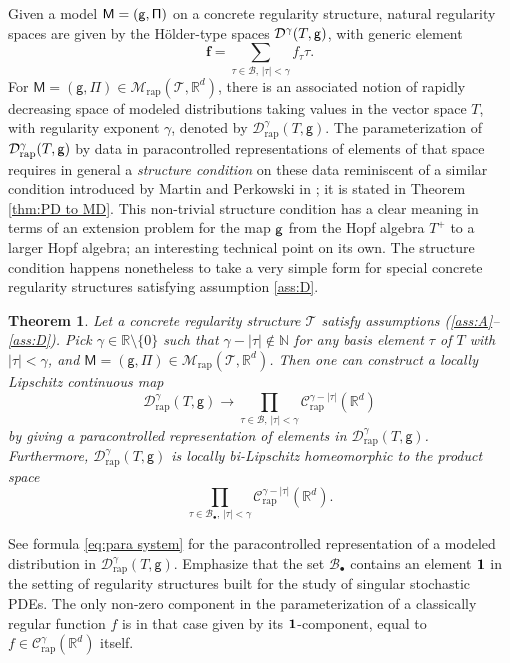 \documentclass[11pt]{article}
\numberwithin{equation}{section}
\newcommand{\sbullet}{{\scriptscriptstyle\bullet}}
\theoremstyle{plain}
\newtheorem{thm}{Theorem}
\theoremstyle{definition}
\newcommand{\bsf}{\boldsymbol{f}}
\newcommand{\rap}{\mathrm{rap}}
\newcommand{\sfM}{\mathsf{M}}
\newcommand{\sfg}{\mathsf{g}}
\newcommand{\sfPi}{\mathsf{\Pi}}
\newcommand{\scrM}{\mathscr{M}}
\newcommand{\scrT}{\mathscr{T}}
\newcommand{\bbN}{\mathbb{N}}
\newcommand{\bbR}{\mathbb{R}}
\newcommand{\mcB}{\mathcal{B}}
\newcommand{\mcC}{\mathcal{C}}
\newcommand{\mcD}{\mathcal{D}}
\begin{document}
Given a model $\sf M=(g,\Pi)$ on a concrete regularity structure, natural regularity spaces are given by the Hölder-type spaces $\mcD^\gamma(T,\sf g)$, with generic element
\[
\bsf = \sum_{\tau\in\mcB,\, \vert\tau\vert < \gamma} f_\tau \tau.
\]
For $\sfM=(\sfg,\sfPi)\in\scrM_\rap(\scrT, \bbR^d)$, there is an associated notion of rapidly decreasing space of modeled distributions taking values in the vector space $T$, with regularity exponent $\gamma$, denoted by $\mcD_\rap^\gamma(T, \sfg)$. The parameterization of $\mcD_\rap^\gamma(T,\sf g)$ by data in paracontrolled representations of elements of that space requires in general a {\it structure condition} on these data reminiscent of a similar condition introduced by Martin and Perkowski in \cite{MP18}; it is stated in Theorem \ref{thm:PD to MD}. This non-trivial structure condition has a clear meaning in terms of an extension problem for the map $\sf g$ from the Hopf algebra $T^+$ to a larger Hopf algebra; an interesting technical point on its own. The structure condition happens nonetheless to take a very simple form for special concrete regularity structures satisfying assumption \eqref{ass:D}.

\begin{thm} \label{mainthm2}
Let a concrete regularity structure $\scrT$ satisfy assumptions \textup{(\ref{ass:A}--\ref{ass:D})}. Pick $\gamma\in\bbR\setminus\{0\}$ such that $\gamma-|\tau|\notin\bbN$ for any basis element $\tau$ of $T$ with $|\tau|<\gamma$, and $\sfM=(\sfg,\sfPi)\in\scrM_\rap(\scrT, \bbR^d)$. Then one can construct a locally Lipschitz continuous map\vspace*{-3pt}
\[
\mcD_\rap^\gamma(T,\sfg) \to \prod_{\tau\in\mcB,\, |\tau|<\gamma} \mcC_\rap^{\gamma-|\tau|}(\bbR^d)
\]
by giving a paracontrolled representation of elements in $\mcD_\rap^\gamma(T,\sfg)$. Furthermore, $\mcD_\rap^\gamma(T, \sfg)$ is locally bi-Lipschitz homeomorphic to the product space\vspace*{-3pt}\enlargethispage{.5\baselineskip}%
\[
\prod_{\tau\in\mcB_\sbullet,\, |\tau|<\gamma} \mcC_\rap^{\gamma-|\tau|}(\bbR^d).
\]
\end{thm}

See formula \eqref{eq:para system} for the paracontrolled representation of a modeled distribution in $\mcD_\rap^\gamma(T,\sfg)$. Emphasize that the set $\mcB_\sbullet$ contains an element $\bf 1$ in the setting of regularity structures built for the study of singular stochastic PDEs. The only non-zero component in the parameterization of a classically regular function $f$ is in that case given by its $\bf 1$-component, equal to $f\in\mcC^\gamma_\rap(\bbR^d)$ itself.
\end{document}
